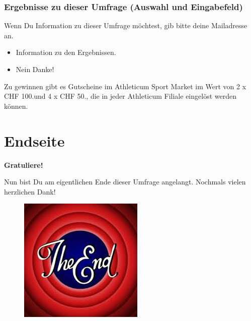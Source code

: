 \subsubsection*{Ergebnisse zu dieser Umfrage (Auswahl und Eingabefeld)}
Wenn Du Information zu dieser Umfrage möchtest, gib bitte deine Mailadresse an.
    \begin{itemize}
      \item Information zu den Ergebnissen.
      \item Nein Danke!      
    \end{itemize}
Zu gewinnen gibt es Gutscheine im Athleticum Sport Market im Wert von 2 x CHF 100.­und 4 x CHF 50.­, die in jeder Athleticum Filiale eingelöst werden können.
\section{Endseite}\label{anhangSection.endseite}
\textbf{Gratuliere!}\par
Nun bist Du am eigentlichen Ende dieser Umfrage angelangt. Nochmals vielen herzlichen Dank!
\begin{figure}[h]
     \centering
     \includegraphics[scale=0.6]{images/anhang/ende.jpeg}
\end{figure}    
    